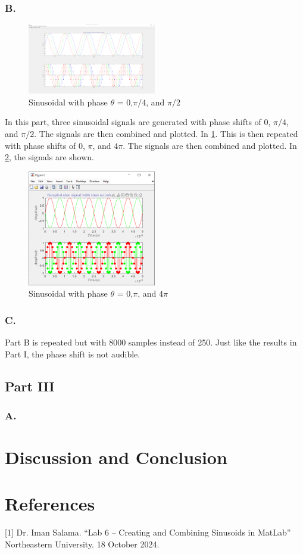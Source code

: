 \documentclass{article}
\begin{document}
\subsubsection*{B.}
\begin{figure}[H]
	\centering
	\includegraphics[width=0.5\textwidth]{fig 2b1.png}
	\caption{Sinusoidal with phase $\theta$ = 0,$\pi/4$, and $\pi/2$}
	\label{fig:fig5}
\end{figure}
In this part, three sinusoidal signals are generated with phase shifts of 0, $\pi/4$,
and $\pi/2$. The signals are then combined and plotted. In \ref{fig:fig5}. This is then
repeated with phase shifts of 0, $\pi$, and $4\pi$. The signals are then combined and 
plotted. In \ref{fig:fig6}, the signals are shown. 

\begin{figure}[H]
	\centering
	\includegraphics[width=0.5\textwidth]{fig 2b2.png}
	\caption{Sinusoidal with phase $\theta$ = 0,$\pi$, and $4\pi$}
	\label{fig:fig6}
\end{figure}

\subsubsection*{C.}
Part B is repeated but with 8000 samples instead of 250. Just like the results in Part I,
the phase shift is not audible.

\subsection*{Part III}
\subsubsection*{A.}

\section{Discussion and Conclusion}

\section{References}
 [1] Dr. Iman Salama. “Lab 6 – Creating and Combining Sinusoids in MatLab” Northeastern University. 18 October 2024.
\end{document}
